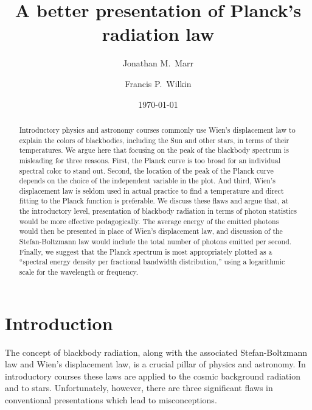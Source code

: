 \documentclass[12pt,aps,prb,preprint]{revtex4}   %
\begin{document}
\title{A better presentation of Planck's radiation law}	%
\author{Jonathan M.\ Marr}
\author{Francis P.\ Wilkin}

\date{\today}

\begin{abstract}
Introductory physics and astronomy courses commonly use Wien's displacement law to explain the colors of blackbodies, including the Sun and other stars, in terms of their temperatures.
We argue here that focusing on the peak of the blackbody spectrum is misleading for three reasons.  First, the Planck curve is too broad for an individual spectral color to stand out. Second, the location of the peak of the Planck curve depends on the choice of the independent variable in the plot.  And third, Wien's displacement law is seldom used in actual practice to find a temperature and direct fitting to the Planck function is preferable.  We discuss these flaws and argue that, at the introductory level, presentation of blackbody radiation in terms of photon statistics would be more effective pedagogically.  The average energy of the emitted photons would then be presented in place of Wien's displacement law, and discussion of the Stefan-Boltzmann law would include the total number of photons emitted per second.  Finally, we suggest that the Planck spectrum is most appropriately plotted as a ``spectral energy density per fractional bandwidth distribution,'' using a logarithmic scale for the wavelength or frequency.
\end{abstract}

\maketitle

\section{Introduction}

The concept of blackbody radiation, along with the associated Stefan-Boltzmann law and Wien's displacement law, is a crucial pillar of physics and astronomy.
In introductory courses these laws are applied to the cosmic background radiation and to stars.  Unfortunately, however, there are three significant flaws in conventional presentations which lead to misconceptions.  
\end{document}
